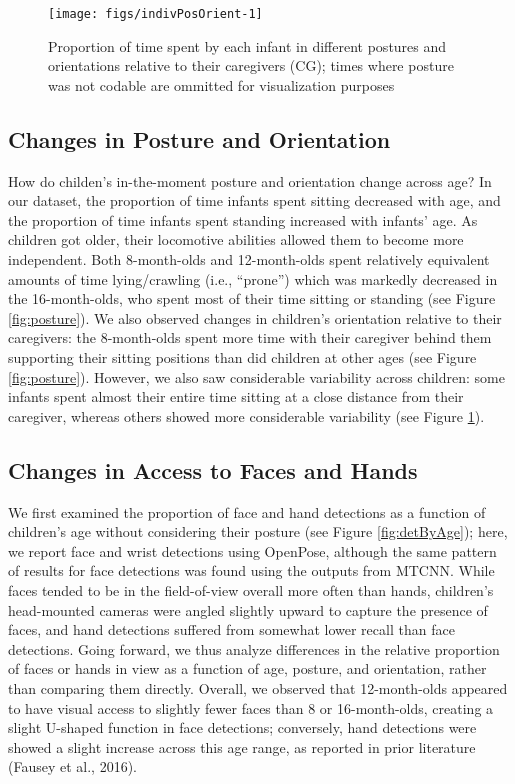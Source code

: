 \documentclass[english,man]{apa6}
\begin{document}
\begin{figure}[H]
\texttt{[image: figs/indivPosOrient-1]} \caption{Proportion of time spent by each infant in different postures and orientations relative to their caregivers (CG); times where posture was not codable are ommitted for visualization purposes}\label{fig:indivPosOrient}
\end{figure}

\subsection{Changes in Posture and
Orientation}\label{changes-in-posture-and-orientation}

How do childen's in-the-moment posture and orientation change across
age? In our dataset, the proportion of time infants spent sitting
decreased with age, and the proportion of time infants spent standing
increased with infants' age. As children got older, their locomotive
abilities allowed them to become more independent. Both 8-month-olds and
12-month-olds spent relatively equivalent amounts of time lying/crawling
(i.e., \enquote{prone}) which was markedly decreased in the
16-month-olds, who spent most of their time sitting or standing (see
Figure \ref{fig:posture}). We also observed changes in children's
orientation relative to their caregivers: the 8-month-olds spent more
time with their caregiver behind them supporting their sitting positions
than did children at other ages (see Figure \ref{fig:posture}). However,
we also saw considerable variability across children: some infants spent
almost their entire time sitting at a close distance from their
caregiver, whereas others showed more considerable variability (see
Figure \ref{fig:indivPosOrient}).

\subsection{Changes in Access to Faces and
Hands}\label{changes-in-access-to-faces-and-hands}

We first examined the proportion of face and hand detections as a
function of children's age without considering their posture (see Figure
\ref{fig:detByAge}); here, we report face and wrist detections using
OpenPose, although the same pattern of results for face detections was
found using the outputs from MTCNN. While faces tended to be in the
field-of-view overall more often than hands, children's head-mounted
cameras were angled slightly upward to capture the presence of faces,
and hand detections suffered from somewhat lower recall than face
detections. Going forward, we thus analyze differences in the relative
proportion of faces or hands in view as a function of age, posture, and
orientation, rather than comparing them directly. Overall, we observed
that 12-month-olds appeared to have visual access to slightly fewer
faces than 8 or 16-month-olds, creating a slight U-shaped function in
face detections; conversely, hand detections were showed a slight
increase across this age range, as reported in prior literature (Fausey
et al., 2016).
\end{document}
